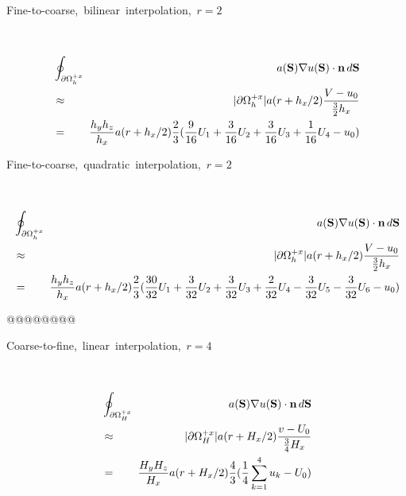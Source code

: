 \documentclass[10pt]{article}
\begin{document}
\begin{minipage}{1.75in}
\mbox{Fine-to-coarse, bilinear interpolation, $r=2$} \\
\end{minipage} \ \ \ \ 
\begin{minipage}{4.00in}
\begin{eqnarray*}
& \oint_{\partial\Omega_h^{+x}}  \!\!\! & a(\textbf{S}) \nabla u(\textbf{S})\cdot \textbf{n} \, d\textbf{S} \\
& \approx & |\partial\Omega_h^{+x}| a(r+h_x/2) \frac{V - u_0}{\frac{3}{2}h_x} \\
& = & \frac{h_yh_z}{h_x}  a(r+h_x/2) \frac{2}{3} (\frac{9}{16} U_1 + \frac{3}{16} U_2 + \frac{3}{16} U_3 + \frac{1}{16}U_4 - u_0)   \\
\end{eqnarray*}
\end{minipage}


\begin{minipage}{1.75in}
\mbox{Fine-to-coarse, quadratic interpolation, $r=2$} \\
\end{minipage} \ \ \ \ 
\begin{minipage}{4.00in}
\begin{eqnarray*}
 & \oint_{\partial\Omega_h^{+x}} \!\!\! & a(\textbf{S}) \nabla u(\textbf{S})\cdot \textbf{n} \, d\textbf{S}  \\
 & \approx & |\partial\Omega_h^{+x}| a(r+h_x/2) \frac{V - u_0}{\frac{3}{2}h_x} \\
& = & \frac{h_yh_z}{h_x}  a(r+h_x/2) \frac{2}{3} (\frac{30}{32} U_1 + \frac{3}{32} U_2 + \frac{3}{32} U_3 + \frac{2}{32}U_4 - \frac{3}{32}U_5 - \frac{3}{32}U_6 - u_0)   \\
\end{eqnarray*}
\end{minipage}

@@@@@@@@

\begin{minipage}{1.75in}
\mbox{Coarse-to-fine, linear interpolation, $r=4$} \\
\end{minipage} \ \ \ \ 
\begin{minipage}{4.00in}
\begin{eqnarray*}
& \oint_{\partial\Omega_H^{+x}}  \!\!\! & a(\textbf{S}) \nabla u(\textbf{S})\cdot \textbf{n} \, d\textbf{S}  \\
& \approx & |\partial\Omega_H^{+x}| a(r+H_x/2) \frac{v - U_0}{\frac{3}{4}H_x} \\
& = & \frac{H_yH_z}{H_x} a(r+H_x/2) \frac{4}{3} (\frac{1}{4} \sum_{k=1}^4 u_k - U_0)   \\
\end{eqnarray*}
\end{minipage}
\end{document}
